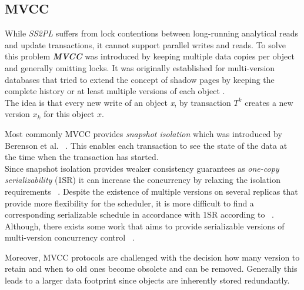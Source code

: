 \subsection{MVCC}
While \emph{SS2PL} suffers from lock contentions between long-running analytical reads and update transactions, it cannot support parallel writes and reads. 
To solve this problem \emph{\textbf{MVCC}} \cite{bernstein:1981} was introduced by keeping multiple data copies per object and generally omitting locks.
It was originally established for multi-version databases that tried to extend the concept of shadow pages by keeping the complete history or at least multiple versions 
of each object \cite{bernstein:1982, bernstein:1983}.\\
The idea is that every new write of an object \emph{x}, by transaction $T^k$ creates a new version $x_k$ for this object $x$.

Most commonly MVCC provides \emph{snapshot isolation} which was introduced by Berenson et al. ~\cite{berenson:1995}.
This enables each transaction to see the state of the data at the time when the transaction has started.\\
Since snapshot isolation provides weaker consistency guarantees as \emph{one-copy serializability} (1SR) it can increase the concurrency by relaxing 
the isolation requirements ~.
Despite the existence of multiple versions on several replicas that provide more flexibility for the scheduler, it 
is more difficult to find a corresponding serializable schedule in accordance with 1SR according to ~\cite{daudjee:2006}.\\
Although, there exists some work that aims to provide serializable versions of multi-version concurrency control ~\cite{fekete:2005, faleiro:2015}.

Moreover, MVCC protocols are challenged with the decision how many version to retain and when to old ones become obsolete and can be removed. 
Generally this leads to a larger data footprint since objects are inherently stored redundantly. 
